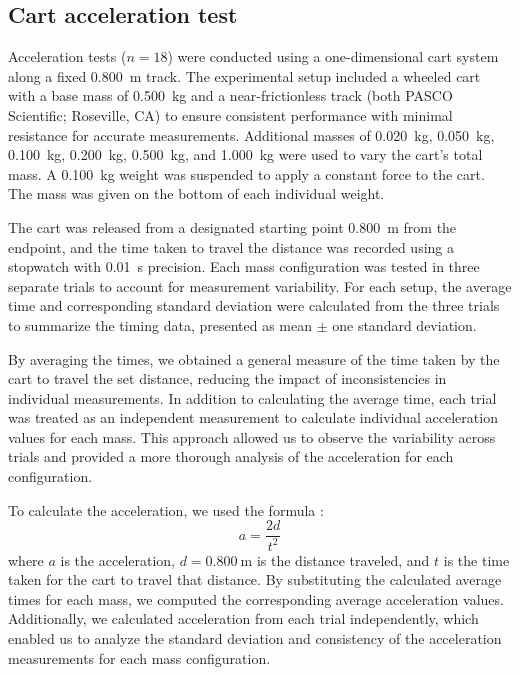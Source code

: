 ﻿\documentclass[reprint,amsmath,amssymb,aps]{revtex4-2}
\begin{document}
\subsection{Cart acceleration test}
Acceleration tests ($n=18$) were conducted using a one-dimensional cart system along a fixed \qty{0.800}{\meter} track. The experimental setup included a wheeled cart with a base mass of \qty{0.500}{\kilo\gram} and a near-frictionless track (both PASCO Scientific; Roseville, CA) to ensure consistent performance with minimal resistance for accurate measurements. Additional masses of \qty{0.020}{\kilo\gram}, \qty{0.050}{\kilo\gram}, \qty{0.100}{\kilo\gram}, \qty{0.200}{\kilo\gram}, \qty{0.500}{\kilo\gram}, and \qty{1.000}{\kilo\gram} were used to vary the cart’s total mass. A \qty{0.100}{\kilo\gram} weight was suspended to apply a constant force to the cart. The mass was given on the bottom of each individual weight. 

The cart was released from a designated starting point \qty{0.800}{\meter} from the endpoint, and the time taken to travel the distance was recorded using a stopwatch with \qty{0.01}{\second} precision. Each mass configuration was tested in three separate trials to account for measurement variability. For each setup, the average time and corresponding standard deviation were calculated from the three trials to summarize the timing data, presented as mean $\pm$ one standard deviation.

By averaging the times, we obtained a general measure of the time taken by the cart to travel the set distance, reducing the impact of inconsistencies in individual measurements. In addition to calculating the average time, each trial was treated as an independent measurement to calculate individual acceleration values for each mass. This approach allowed us to observe the variability across trials and provided a more thorough analysis of the acceleration for each configuration.

To calculate the acceleration, we used the formula \cite{knight2017physics}:  
\begin{equation}
a = \dfrac{2d}{t^2}
\end{equation}
where $a$ is the acceleration, $d=\qty{0.800}{\meter}$ is the distance traveled, and $t$ is the time taken for the cart to travel that distance. By substituting the calculated average times for each mass, we computed the corresponding average acceleration values. Additionally, we calculated acceleration from each trial independently, which enabled us to analyze the standard deviation and consistency of the acceleration measurements for each mass configuration.
\end{document}

